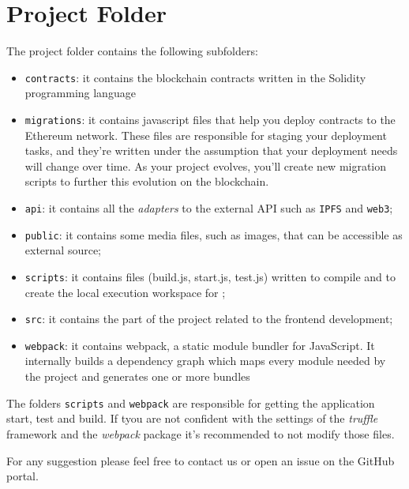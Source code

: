 \section{Project Folder}
The project folder contains the following subfolders:
\begin{itemize}
	\item\verb|contracts|: it contains the blockchain contracts written in the Solidity programming language
    \item\verb|migrations|: it contains javascript files that help you deploy contracts to the Ethereum network. These files are
    responsible for staging your deployment tasks, and they're written under the assumption that your deployment needs will change over time.
    As your project evolves, you'll create new migration scripts to further this evolution on the blockchain.
    \item\verb|api|: it  contains all the \emph{adapters} to the external API such as \verb|IPFS| and \verb|web3|;
    \item\verb|public|: it contains some media files, such as images, that can be accessible as external source;
    \item\verb|scripts|: it contains files (build.js, start.js, test.js) written to compile and to create the local execution workspace for
    	\project;
    \item\verb|src|: it contains the part of the project related to the frontend development;
    \item\verb|webpack|: it contains webpack, a static module bundler for JavaScript. It internally builds a dependency graph 
    which maps every module needed by the project and generates one or more bundles
\end{itemize}
The folders \verb|scripts| and \verb|webpack| are responsible for getting the application start, test and build. If tyou are not confident with the settings of the \emph{truffle} framework and the \emph{webpack} package it's recommended to not modify those files.

For any suggestion please feel free to contact us or open an issue on the GitHub portal.